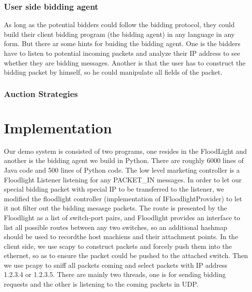 \documentclass[a4paper,11pt,twocolumn]{article}
\begin{document}
\subsubsection{User side bidding agent}
As long as the potential bidders could follow the bidding protocol, they could build their client bidding program (the bidding agent) in any language
in any form. But there ar some hints for buiding the bidding agent. One is the bidders have to listen to potential incoming packets and analyze 
their IP address to see whether they are bidding messages. Another is that the user has to construct the bidding packet by himself, so he could 
manipulate all fields of the packet. 

\subsubsection{Auction Strategies}


\section{Implementation}
Our demo system is consisted of two programs, one resides in the FloodLight and another is the bidding agent we build in Python. There are roughly 
6000 lines of Java code and 500 lines of Python code. The low level marketing controller is a Floodlight Listener listening for any PACKET\_IN messages.
In order to let our special bidding packet with special IP to be transferred to the listener, we modified the floodlight controller (implementation 
of IFloodlightProvider) to let it not filter out the bidding mesasge packets. The route is presented by the Floodlight as a list of switch-port pairs,
and Floodlight provides an interface to list all possible routes between any two switches, so an additional hashmap should be used to recordthe host machiens
and their attachment points. In the client side, we use scapy to construct packets and forcely push them into the ethernet, so as to ensure the packet 
could be pushed to the attached switch. Then we use pcapy to sniff all packets coming and select packets with IP address 1.2.3.4 or 1.2.3.5. There are mainly
two threads, one is for sending bidding requests and the other is listening to the coming packets in UDP. 
\end{document}
